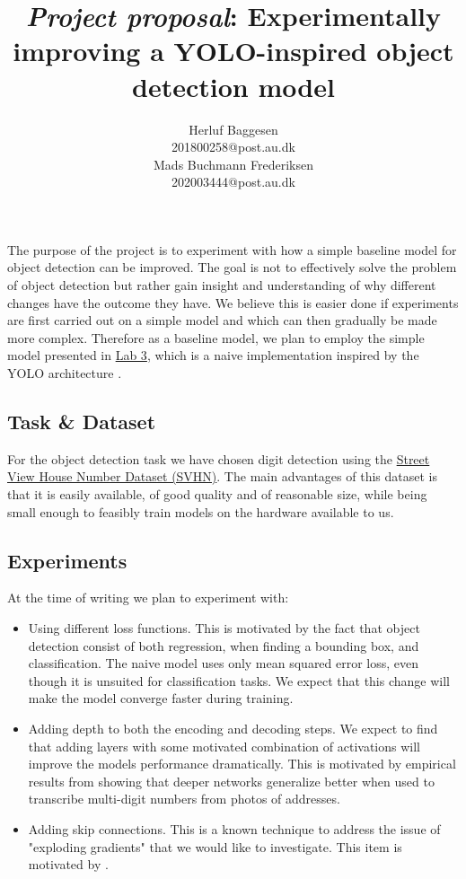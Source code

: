 \documentclass{article}
\title{\emph{Project proposal}: Experimentally improving a YOLO-inspired object detection model}
\author{
	Herluf Baggesen \\
	201800258@post.au.dk \\
	\And
	Mads Buchmann Frederiksen \\
	202003444@post.au.dk\\
}
\date{}
\begin{document}
\maketitle

The purpose of the project is to experiment with how a simple baseline model for object detection can be improved. 
The goal is not to effectively solve the problem of object detection but rather gain insight and understanding of why different changes have the outcome they have. We believe this is easier done if experiments are first carried out on a simple model and which can then gradually be made more complex. 
Therefore as a baseline model, we plan to employ the simple model presented in \href{https://github.com/klaverhenrik/Deep-Learing-for-Visual-Recognition-2022/blob/main/Lab3_FunWithMNIST.ipynb}{Lab 3}, which is a naive implementation inspired by the YOLO architecture \citep{YOLO}.

\subsection{Task \& Dataset}
For the object detection task we have chosen digit detection using the \href{http://ufldl.stanford.edu/housenumbers/}{Street View House Number Dataset (SVHN)}. The main advantages of this dataset is that it is easily available, of good quality and of reasonable size, while being small enough to feasibly train models on the hardware available to us.
\subsection{Experiments}
At the time of writing we plan to experiment with:
\begin{itemize}
\item Using different loss functions. This is motivated by the fact that object detection consist of both regression, when finding a bounding box, and classification. The naive model uses only mean squared error loss, even though it is unsuited for classification tasks. We expect that this change will make the model converge faster during training.
\item Adding depth to both the encoding and decoding steps. We expect to find that adding layers with some motivated combination of activations will improve the models performance dramatically. This is motivated by empirical results from \citep{Goodfellow et al.} showing that deeper networks generalize better when used to transcribe multi-digit numbers from photos of addresses. 
\item Adding skip connections. This is a known technique to address the issue of "exploding gradients" that we would like to investigate. This item is motivated by \citep{SGP}.
\end{itemize}
\end{document}
